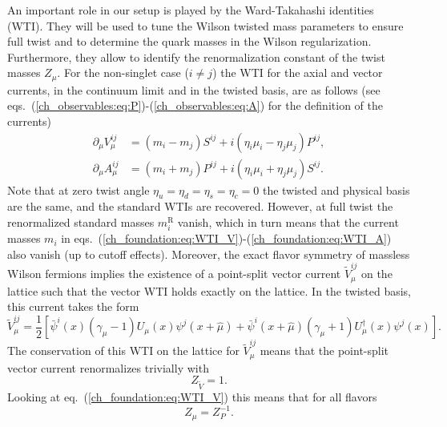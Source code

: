 An important role in our setup is played by the Ward-Takahashi identities (WTI). They will be used to tune the Wilson twisted mass parameters to ensure full twist and to determine the quark masses in the Wilson regularization. Furthermore, they allow to identify the renormalization constant of the twist masses $Z_{\mu}$. For the non-singlet case ($i\neq j$) the WTI for the axial and vector currents, in the continuum limit and in the twisted basis, are as follows (see eqs.~(\ref{ch_observables:eq:P})-(\ref{ch_observables:eq:A}) for the definition of the currents)
\begin{align}
\label{ch_foundation:eq:WTI_V}
\partial_{\mu}V_{\mu}^{ij}&=(m_i-m_j)S^{ij}+i(\eta_i\mu_i-\eta_j\mu_j)P^{ij},\\
\label{ch_foundation:eq:WTI_A}
\partial_{\mu}A_{\mu}^{ij}&=(m_i+m_j)P^{ij}+i(\eta_i\mu_i+\eta_j\mu_j)S^{ij}.
\end{align}
Note that at zero twist angle $\eta_u=\eta_d=\eta_s=\eta_c=0$ the twisted and physical basis are the same, and the standard WTIs are recovered. However, at full twist the renormalized standard masses $m_i^{\textrm{R}}$ vanish, which in turn means that the current masses $m_{i}$ in eqs.~(\ref{ch_foundation:eq:WTI_V})-(\ref{ch_foundation:eq:WTI_A}) also vanish (up to cutoff effects). Moreover, the exact flavor symmetry of massless Wilson fermions implies the existence of a point-split vector current $\tilde{V}_{\mu}^{ij}$ on the lattice such that the vector WTI holds exactly on the lattice. In the twisted basis, this current takes the form
\begin{equation}
\tilde{V}_{\mu}^{ij}=\frac{1}{2}\left[\bar{\psi}^i(x)(\gamma_{\mu}-1)U_{\mu}(x)\psi^j(x+\hat{\mu})+\bar{\psi}^i(x+\hat{\mu})(\gamma_{\mu}+1)U_{\mu}^{\dagger}(x)\psi^j(x)\right].
\end{equation}
The conservation of this WTI on the lattice for $\tilde{V}_{\mu}^{ij}$ means that the point-split vector current renormalizes trivially with
\begin{equation}
\label{ch_foundation:eq:ZV=1}
Z_{\tilde{V}}=1.
\end{equation}
Looking at eq.~(\ref{ch_foundation:eq:WTI_V}) this means that for all flavors
\begin{equation}
\label{ch_foundation:eq:Zmu}
Z_{\mu}=Z_P^{-1}.
\end{equation}



